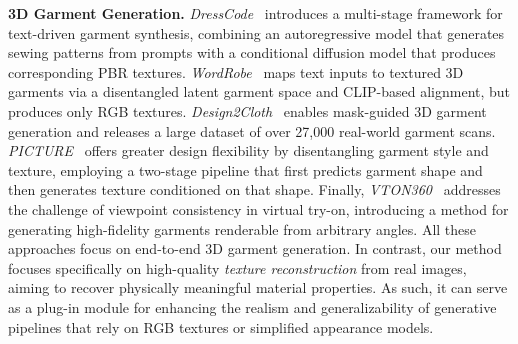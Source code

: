\documentclass[11pt,twocolumn]{article}
\begin{document}
\textbf{3D Garment Generation.}  
\textit{DressCode}~\cite{dresscode} introduces a multi-stage framework for text-driven garment 
synthesis, combining an autoregressive model that generates sewing patterns from prompts with 
a conditional diffusion model that produces corresponding PBR textures. 
\textit{WordRobe}~\cite{WordRobe} maps text inputs to textured 3D garments via a disentangled 
latent garment space and CLIP-based alignment, but produces only RGB textures. 
\textit{Design2Cloth}~\cite{design2cloth} enables mask-guided 3D garment generation and 
releases a large dataset of over 27{,}000 real-world garment scans. 
\textit{PICTURE}~\cite{picture} offers greater design flexibility by disentangling 
garment style and texture, employing a two-stage pipeline that first predicts garment shape
 and then generates texture conditioned on that shape. Finally, \textit{VTON360}~\cite{vton360} 
 addresses the challenge of viewpoint consistency in virtual try-on, introducing a method 
 for generating high-fidelity garments renderable from arbitrary angles.  
All these approaches focus on end-to-end 3D garment generation. 
In contrast, our method focuses specifically on high-quality \textit{texture reconstruction} 
from real images, aiming to recover physically meaningful material properties. 
As such, it can serve as a plug-in module for enhancing the realism and generalizability of 
generative pipelines that rely on RGB textures or simplified appearance models.
\end{document}
